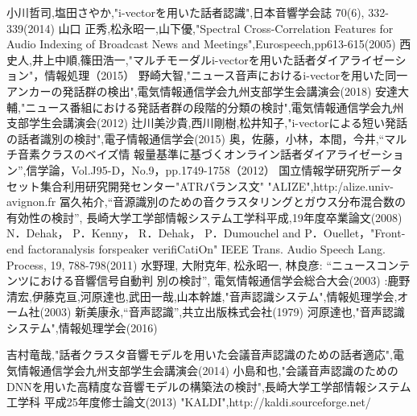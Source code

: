 \begin{thebibliography}{99}     %
小川哲司,塩田さやか,"i-vectorを用いた話者認識",日本音響学会誌 70(6), 332-339(2014)
山口 正秀,松永昭一,山下優,"Spectral Cross-Correlation Features for Audio Indexing of Broadcast News and Meetings",Eurospeech,pp613-615(2005)
西史人,井上中順,篠田浩一,"マルチモーダルi-vectorを用いた話者ダイアライゼーション"，情報処理（2015）
野崎大智,"ニュース音声におけるi-vectorを用いた同一アンカーの発話群の検出",電気情報通信学会九州支部学生会講演会(2018)
安達大輔,"ニュース番組における発話者群の段階的分類の検討",電気情報通信学会九州支部学生会講演会(2012)
辻川美沙貴,西川剛樹,松井知子,"i-vectorによる短い発話の話者識別の検討",電子情報通信学会(2015)
奥，佐藤，小林，本間，今井,“マルチ音素クラスのベイズ情
報量基準に基づくオンライン話者ダイアライゼーション”,信学論，Vol.J95-D，No.9，pp.1749-1758（2012）
国立情報学研究所データセット集合利用研究開発センター"ATRバランス文"
"ALIZE",http:/alize.univ-avignon.fr
冨久祐介,“音源識別のための音クラスタリングとガウス分布混合数の有効性の検討”,
長崎大学工学部情報システム工学科平成,19年度卒業論文(2008)
N．Dehak， P．Kenny， R．Dehak， P．Dumouchel and P．Ouellet，"Front-end factoranalysis forspeaker verifiCatiOn" IEEE Trans. Audio Speech Lang. Process, 19, 788-798(2011)
水野理, 大附克年, 松永昭一, 林良彦: “ニュースコンテンツにおける音響信号自動判
別の検討”, 電気情報通信学会総合大会(2003)
:鹿野清宏,伊藤克亘,河原達也,武田一哉,山本幹雄,"音声認識システム",情報処理学会,オーム社(2003)
新美康永,“音声認識”,共立出版株式会社(1979)
河原達也,"音声認識システム",情報処理学会(2016)

吉村竜哉,"話者クラスタ音響モデルを用いた会議音声認識のための話者適応",電気情報通信学会九州支部学生会講演会(2014)
小島和也,"会議音声認識のためのDNNを用いた高精度な音響モデルの構築法の検討",長崎大学工学部情報システム工学科 平成25年度修士論文(2013)
"KALDI",http://kaldi.sourceforge.net/
\end{thebibliography}
